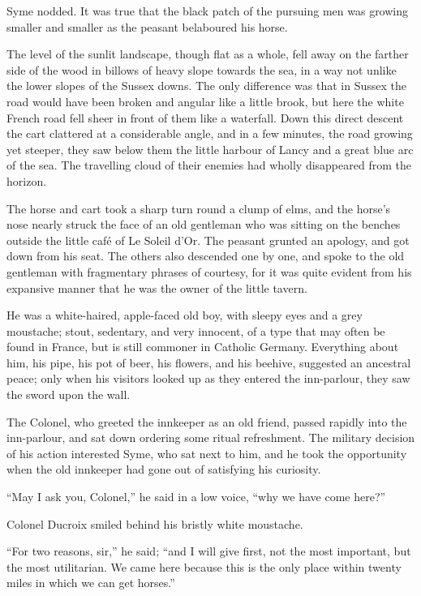 Syme nodded. It was true that the black patch of the pursuing men was growing smaller and smaller as the peasant belaboured his horse.

The level of the sunlit landscape, though flat as a whole, fell away on the farther side of the wood in billows of heavy slope towards the sea, in a way not unlike the lower slopes of the Sussex downs. The only difference was that in Sussex the road would have been broken and angular like a little brook, but here the white French road fell sheer in front of them like a waterfall. Down this direct descent the cart clattered at a considerable angle, and in a few minutes, the road growing yet steeper, they saw below them the little harbour of Lancy and a great blue arc of the sea. The travelling cloud of their enemies had wholly disappeared from the horizon.

The horse and cart took a sharp turn round a clump of elms, and the horse’s nose nearly struck the face of an old gentleman who was sitting on the benches outside the little café of Le Soleil d’Or. The peasant grunted an apology, and got down from his seat. The others also descended one by one, and spoke to the old gentleman with fragmentary phrases of courtesy, for it was quite evident from his expansive manner that he was the owner of the little tavern.

He was a white-haired, apple-faced old boy, with sleepy eyes and a grey moustache; stout, sedentary, and very innocent, of a type that may often be found in France, but is still commoner in Catholic Germany. Everything about him, his pipe, his pot of beer, his flowers, and his beehive, suggested an ancestral peace; only when his visitors looked up as they entered the inn-parlour, they saw the sword upon the wall.

The Colonel, who greeted the innkeeper as an old friend, passed rapidly into the inn-parlour, and sat down ordering some ritual refreshment. The military decision of his action interested Syme, who sat next to him, and he took the opportunity when the old innkeeper had gone out of satisfying his curiosity.

“May I ask you, Colonel,” he said in a low voice, “why we have come here?”

Colonel Ducroix smiled behind his bristly white moustache.

“For two reasons, sir,” he said; “and I will give first, not the most important, but the most utilitarian. We came here because this is the only place within twenty miles in which we can get horses.”

